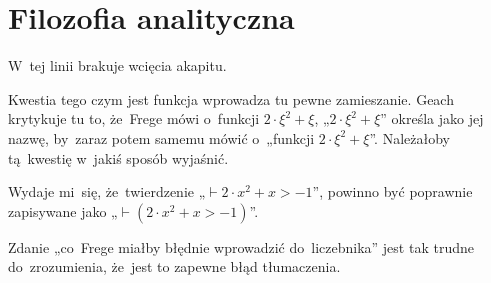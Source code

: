 \documentclass[a4paper,11pt]{article}
\begin{document}










\newpage
\section{Filozofia analityczna}

\vspace{\spaceTwo}







\start {} W~tej linii brakuje wcięcia akapitu.

\vspace{\spaceFour}





\start {} Kwestia tego czym jest funkcja wprowadza tu
pewne zamieszanie. Geach krytykuje tu to, że~Frege mówi o~funkcji
$2 \cdot \xi^{ 2 } + \xi$, „$2 \cdot \xi^{ 2 } + \xi$” określa jako
jej nazwę, by~zaraz potem samemu mówić o~„funkcji
$2 \cdot \xi^{ 2 } + \xi$”. Należałoby tą~kwestię w~jakiś sposób
wyjaśnić.

\vspace{\spaceFour}





\start {} Wydaje mi~się, że~twierdzenie
„$\vdash 2 \cdot x^{ 2 } + x > -1$”, powinno być poprawnie
zapisywane jako „$\vdash( 2 \cdot x^{ 2 } + x > -1)$”.

\vspace{\spaceFour}





\start {} Zdanie „co~Frege miałby błędnie wprowadzić
do~liczebnika” jest tak trudne do~zrozumienia, że~jest to zapewne
błąd tłumaczenia.

\vspace{\spaceFour}
\end{document}
